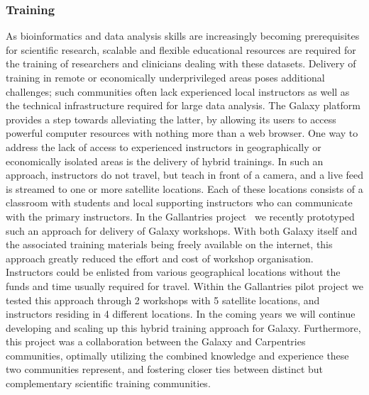 \subsubsection{Training}
As bioinformatics and data analysis skills are increasingly becoming prerequisites for scientific research, scalable and flexible educational resources are required for the training of researchers and clinicians dealing with these datasets.
Delivery of training in remote or economically underprivileged areas poses additional challenges; such communities often lack experienced local instructors as well as the technical infrastructure required for large data analysis.
The Galaxy platform provides a step towards alleviating the latter, by allowing its users to access powerful computer resources with nothing more than a web browser. One way to address the lack of access to experienced instructors in geographically or economically isolated areas is the delivery of hybrid trainings.
In such an approach, instructors do not travel, but teach in front of a camera, and a live feed is streamed to one or more satellite locations. Each of these locations consists of a classroom with students and local supporting instructors who can communicate with the primary instructors. In the Gallantries project~\cite{gallantries} we recently prototyped such an approach for delivery of Galaxy workshops.
With both Galaxy itself and the associated training materials being freely available on the internet, this approach greatly reduced the effort and cost of workshop organisation.
Instructors could be enlisted from various geographical locations without the funds and time usually required for travel. Within the Gallantries pilot project we tested this approach through 2 workshops with 5 satellite locations, and instructors residing in 4 different locations.
In the coming years we will continue developing and scaling up this hybrid training approach for Galaxy. Furthermore, this project was a collaboration between the Galaxy and Carpentries~\cite{wilson2006software} communities, optimally utilizing the combined knowledge and experience these two communities represent, and fostering closer ties between distinct but complementary scientific training communities.



